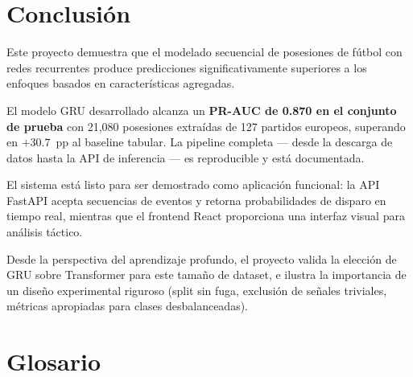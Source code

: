 \documentclass[12pt,a4paper]{article}
\newcommand{\metric}[1]{\textbf{\textcolor{primary}{#1}}}
\begin{document}
\section{Conclusión}

Este proyecto demuestra que el modelado secuencial de posesiones de fútbol con
redes recurrentes produce predicciones significativamente superiores a los enfoques
basados en características agregadas.

El modelo GRU desarrollado alcanza un \metric{PR-AUC de 0.870 en el conjunto de prueba}
con 21{,}080 posesiones extraídas de 127 partidos europeos, superando en $+30.7$~pp
al baseline tabular. La pipeline completa — desde la descarga de datos hasta la API
de inferencia — es reproducible y está documentada.

El sistema está listo para ser demostrado como aplicación funcional: la API FastAPI
acepta secuencias de eventos y retorna probabilidades de disparo en tiempo real,
mientras que el frontend React proporciona una interfaz visual para análisis táctico.

Desde la perspectiva del aprendizaje profundo, el proyecto valida la elección de
GRU sobre Transformer para este tamaño de dataset, e ilustra la importancia de un
diseño experimental riguroso (split sin fuga, exclusión de señales triviales,
métricas apropiadas para clases desbalanceadas).


\appendix

\section{Glosario}
\label{app:glosario}
\end{document}
